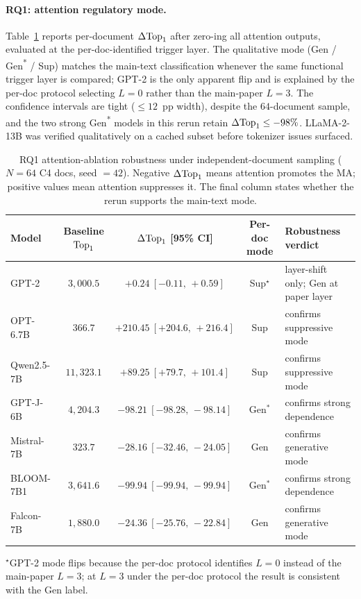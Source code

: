 \paragraph{RQ1: attention regulatory mode.}
Table~\ref{tab:robust-rq1} reports per-document $\Delta\mathrm{Top}_1$ after
zero-ing all attention outputs, evaluated at the per-doc-identified
trigger layer. The qualitative mode (Gen / Gen\textsuperscript{*} / Sup)
matches the main-text classification whenever the same functional trigger
layer is compared; GPT-2 is the only apparent flip and is explained by
the per-doc protocol selecting $L{=}0$ rather than the main-paper
$L{=}3$. The confidence intervals are tight ($\leq 12$~pp width),
despite the $64$-document sample, and the two strong
Gen\textsuperscript{*} models in this rerun retain
$\Delta\mathrm{Top}_1 \leq -98\%$. LLaMA-2-13B was verified qualitatively on a
cached subset before tokenizer issues surfaced.

\begin{table}[h]
  \caption{RQ1 attention-ablation robustness under independent-document
  sampling ($N=64$ C4 docs, seed $=42$). Negative $\Delta\mathrm{Top}_1$ means
  attention promotes the MA; positive values mean attention suppresses it.
  The final column states whether the rerun supports the main-text mode.}
  \label{tab:robust-rq1}
  \centering
  \small
  \setlength{\tabcolsep}{4pt}
  \begin{tabular}{@{}lcccp{3.4cm}@{}}
    \toprule
    Model & Baseline $\mathrm{Top}_1$ & $\Delta\mathrm{Top}_1$ [95\% CI] & Per-doc mode & Robustness verdict \\
    \midrule
    GPT-2      & $3{,}000.5$  & $+0.24\ [-0.11,\,+0.59]$     & Sup$^{\star}$ & layer-shift only; Gen at paper layer \\
    OPT-6.7B   & $366.7$      & $+210.45\ [+204.6,\,+216.4]$ & Sup           & confirms suppressive mode \\
    Qwen2.5-7B & $11{,}323.1$ & $+89.25\ [+79.7,\,+101.4]$   & Sup           & confirms suppressive mode \\
    GPT-J-6B   & $4{,}204.3$  & $-98.21\ [-98.28,\,-98.14]$  & Gen$^{*}$     & confirms strong dependence \\
    Mistral-7B & $323.7$      & $-28.16\ [-32.46,\,-24.05]$  & Gen           & confirms generative mode \\
    BLOOM-7B1  & $3{,}641.6$  & $-99.94\ [-99.94,\,-99.94]$  & Gen$^{*}$     & confirms strong dependence \\
    Falcon-7B  & $1{,}880.0$  & $-24.36\ [-25.76,\,-22.84]$  & Gen           & confirms generative mode \\
    \bottomrule
  \end{tabular}

  \smallskip
  \footnotesize
  $^{\star}$GPT-2 mode flips because the per-doc protocol identifies
  $L{=}0$ instead of the main-paper $L{=}3$; at $L{=}3$ under the
  per-doc protocol the result is consistent with the Gen label.
\end{table}

